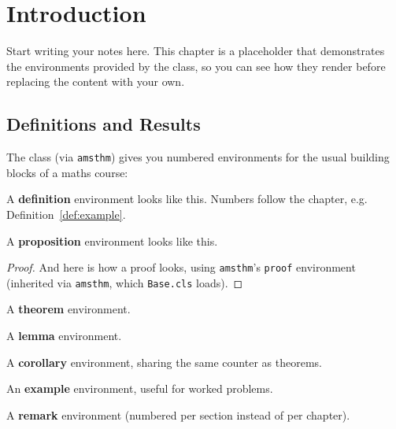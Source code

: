 \chapter{Introduction}
\label{ch:intro}

Start writing your notes here. This chapter is a placeholder that
demonstrates the environments provided by the class, so you can see how
they render before replacing the content with your own.

\section{Definitions and Results}

The class (via \texttt{amsthm}) gives you numbered environments for the
usual building blocks of a maths course:

\begin{definition}
\label{def:example}
A \textbf{definition} environment looks like this. Numbers follow the
chapter, e.g. Definition~\ref{def:example}.
\end{definition}

\begin{proposition}
\label{prop:example}
A \textbf{proposition} environment looks like this.
\end{proposition}

\begin{proof}
And here is how a proof looks, using \texttt{amsthm}'s \texttt{proof}
environment (inherited via \texttt{amsthm}, which \texttt{Base.cls}
loads).
\end{proof}

\begin{theorem}
\label{thm:example}
A \textbf{theorem} environment.
\end{theorem}

\begin{lemma}
\label{lem:example}
A \textbf{lemma} environment.
\end{lemma}

\begin{corollary}
\label{cor:example}
A \textbf{corollary} environment, sharing the same counter as theorems.
\end{corollary}

\begin{example}
\label{ex:example}
An \textbf{example} environment, useful for worked problems.
\end{example}

\begin{remark}
A \textbf{remark} environment (numbered per section instead of per
chapter).
\end{remark}

